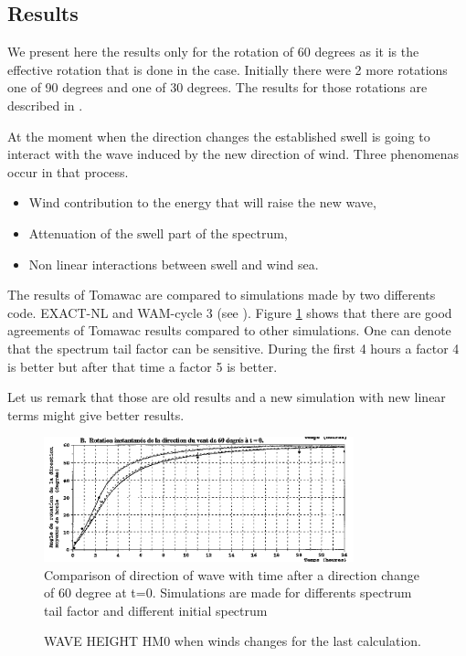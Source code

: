 \subsection{Results}
%
We present here the results only for the rotation of 60 degrees as it is the effective rotation that is done in the case. Initially there were 2 more rotations one of 90 degrees and one of 30 degrees. The results for those rotations are described in \cite{Benoit1996_2}.

At the moment when the direction changes the established swell is going to interact with the wave induced by the new direction of wind. Three phenomenas occur in that process.
\begin {itemize}
\item Wind contribution to the energy that will raise the new wave,
\item Attenuation of the swell part of the spectrum,
\item Non linear interactions between swell and wind sea.
\end{itemize}

The results of Tomawac are compared to simulations made by two differents code. EXACT-NL and WAM-cycle 3 (see \cite{Vanvledder1990}). Figure  \ref{resturnwind} shows that there are good agreements of Tomawac results compared to other simulations. One can denote that the spectrum tail factor can be sensitive. During the first 4 hours a factor 4 is better but after that time a factor 5 is better.

Let us remark that those are old results and a new simulation with new linear terms might give better results.

\begin{figure} [!h]
\centering
\includegraphics[width=0.8\textwidth]{resuTW60.png}
 \caption{Comparison of direction of wave with time after a direction change of 60 degree at t=0. Simulations are made for differents spectrum tail factor and different initial spectrum}
\label{resturnwind}
\end{figure}

\begin{figure} [!h]
\centering
{}
 \caption{WAVE HEIGHT HM0 when winds changes for the last calculation.}
\label{resturningwind}
\end{figure}
